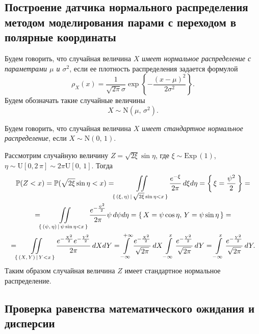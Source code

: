 \subsection{Построение датчика нормального распределения методом моделирования парами с переходом в полярные координаты}
\begin{definition}
        Будем говорить, что случайная величина $X$ \textit{имеет нормальное распределение с параметрами $\mu$ и $\sigma^2$}, если ее плотность распределения задается формулой
$$
        \rho_X(x)
        =
        \frac{1}{\sqrt{2\pi}\sigma}
        \exp\left\{
                -\frac{(x - \mu)^2}{2\sigma^2}
        \right\}.
$$
        Будем обозначать такие случайные величины
$$
        X \sim \mbox{N}(\mu,\,\sigma^2).
$$
\end{definition}

\begin{remark}
        Будем говорить, что случайная величина $X$ \textit{имеет стандартное нормальное распределение}, если $X \sim \mbox{N}(0,\,1)$.
\end{remark}

Рассмотрим случайную величину $Z = \sqrt{2\xi}\sin\eta$, где $\xi\sim\mbox{Exp}\,(1)$, $\eta\sim\mbox{U}[0,2\,\pi] \sim 2\pi\mbox{U}[0,\,1]$. Тогда
\begin{multline*}
        \mathbb{P}(Z < x)
        =
        \mathbb{P}(\sqrt{2\xi}\sin\eta < x)
        =
        \iint\limits_{\{\,(\xi,\,\eta)\,|\,\sqrt{2\xi}\sin\eta<x\,\}} \frac{e^{-\xi}}{2\pi}\,d\xi d\eta
        =
        \left\{\,\xi = \frac{\psi^2}{2}\,\right\}
        = \\ =
        \iint\limits_{\{\,(\psi,\,\eta)\,|\,\psi\sin\eta<x\,\}} \frac{e^{-\frac{\psi^2}{2}}}{2\pi}\psi\,d\psi d\eta
        =
        \{\,X = \psi\cos\eta,\,Y = \psi\sin\eta\,\}
        = \\ =
        \iint\limits_{\{\,(X,\,Y)\,|\,Y < x\,\}} \frac{e^{-\frac{X^2}{2}}e^{-\frac{Y^2}{2}}}{2\pi}\,dXdY
        =
        \int\limits_{-\infty}^{+\infty}\frac{e^{-\frac{X^2}{2}}}{\sqrt{2\pi}}\,dX \int\limits_{-\infty}^{x} \frac{e^{-\frac{Y^2}{2}}}{\sqrt{2\pi}}\,dY
        =
        \int\limits_{-\infty}^{x}\frac{e^{-\frac{Y^2}{2}}}{\sqrt{2\pi}}\,dY.
\end{multline*}
Таким образом случайная величина $Z$ имеет стандартное нормальное распределение.


\subsection{Проверка равенства математического ожидания и дисперсии}

